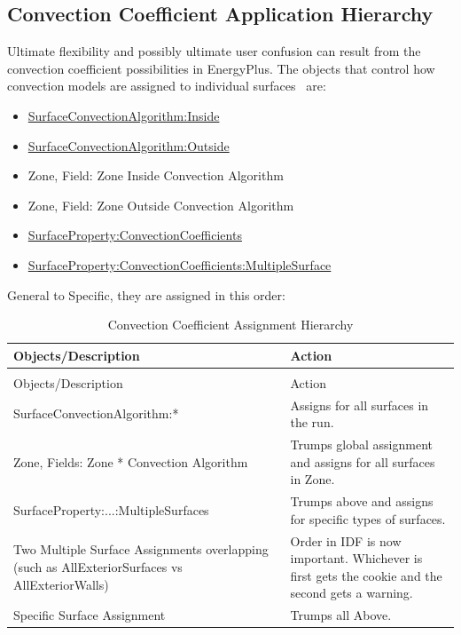 \subsection{Convection Coefficient Application Hierarchy}\label{convection-coefficient-application-hierarchy}

Ultimate flexibility and possibly ultimate user confusion can result from the convection coefficient possibilities in EnergyPlus. The objects that control how convection models are assigned to individual surfaces~ are:

\begin{itemize}
\item
  \hyperref[surfaceconvectionalgorithminside]{SurfaceConvectionAlgorithm:Inside}
\item
  \hyperref[surfaceconvectionalgorithmoutside]{SurfaceConvectionAlgorithm:Outside}
\item
  Zone, Field: Zone Inside Convection Algorithm
\item
  Zone, Field: Zone Outside Convection Algorithm
\item
  \hyperref[surfacepropertyconvectioncoefficients]{SurfaceProperty:ConvectionCoefficients}
\item
  \hyperref[surfacepropertyconvectioncoefficientsmultiplesurface]{SurfaceProperty:ConvectionCoefficients:MultipleSurface}
\end{itemize}

General to Specific, they are assigned in this order:

\begin{longtable}[c]{p{2.96in}p{3.03in}}
\caption{Convection Coefficient Assignment Hierarchy \label{table:convection-coefficient-assignment-hierarchy}} \tabularnewline
\toprule
Objects/Description & Action \tabularnewline
\midrule
\endfirsthead

\caption[]{Convection Coefficient Assignment Hierarchy} \tabularnewline
\toprule
Objects/Description & Action \tabularnewline
\midrule
\endhead

SurfaceConvectionAlgorithm:* & Assigns for all surfaces in the run. \tabularnewline
Zone, Fields: Zone * Convection Algorithm & Trumps global assignment and assigns for all surfaces in Zone. \tabularnewline
SurfaceProperty:...:MultipleSurfaces & Trumps above and assigns for specific types of surfaces. \tabularnewline
Two Multiple Surface Assignments overlapping (such as AllExteriorSurfaces vs AllExteriorWalls) & Order in IDF is now important. Whichever is first gets the cookie and the second gets a warning. \tabularnewline
Specific Surface Assignment & Trumps all Above. \tabularnewline
\bottomrule
\end{longtable}

